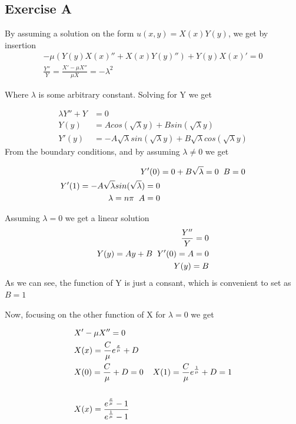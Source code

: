\documentclass[a4paper,norsk]{article}
\begin{document}
\subsection*{Exercise A}
By assuming a solution on the form $u(x,y) = X(x)Y(y)$, we get by insertion
\begin{align*}
-\mu(Y(y)X(x)'' + X(x)Y(y)'') + Y(y)X(x)' = 0 \\
\frac{Y''}{Y} = \frac{X' - \mu X''}{\mu X} = -\lambda^2
\end{align*}

Where $\lambda$ is some arbitrary constant.
Solving for Y we get

\begin{align*}
\lambda Y'' + Y &= 0 \\
Y(y) &= Acos(\sqrt{\lambda} y) + B sin(\sqrt{\lambda}y) \\
Y'(y) &= -A\sqrt{\lambda}sin(\sqrt{\lambda} y) + B\sqrt{\lambda}cos(\sqrt{\lambda} y)
\end{align*}
From the boundary conditions, and by assuming $\lambda \neq 0$ we get

\begin{align*}
Y'(0) &= 0 + B\sqrt{\lambda} = 0 \hspace{2mm} B = 0 \\
Y'(1) = -A\sqrt{\lambda}sin(\sqrt{\lambda}) =0 \\
\lambda = n \pi \hspace{2mm} A = 0
\end{align*}

Assuming $\lambda = 0$ we get a linear solution
\begin{align*}
\frac{Y''}{Y} =  0 \\
Y(y) = Ay + B \hspace{2mm} Y'(0) = A = 0 \\
Y(y) = B
\end{align*}
As we can see, the function of Y is just a consant, which is convenient to set as $B = 1$

Now, focusing on the other function of X for $\lambda = 0$ we get

\begin{align*}
&X' - \mu X''= 0 \\
&X(x) = \frac{C}{\mu}e^{\frac{x}{\mu}} + D \\
&X(0) = \frac{C}{\mu} + D = 0 \hspace{4mm} X(1) = \frac{C}{\mu}e^{\frac{1}{\mu}} + D = 1 \\ \\
&X(x) = \frac{e^{\frac{x}{\mu}} -1}{e^{\frac{1}{\mu}} - 1}
\end{align*}
\end{document}
